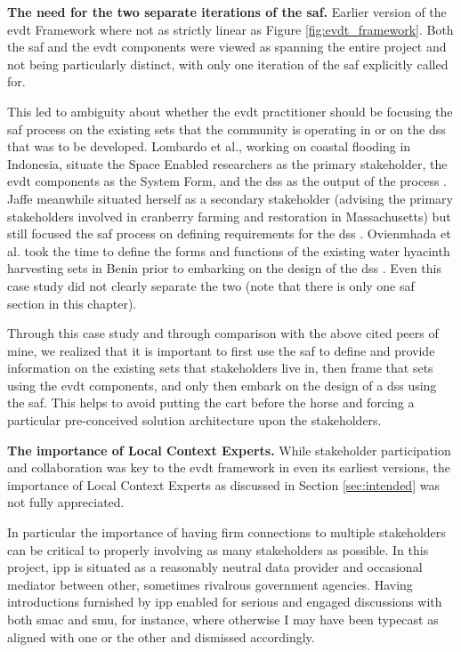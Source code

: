 \textbf{The need for the two separate iterations of the \ac{saf}.} Earlier version of the \ac{evdt} Framework where not as strictly linear as Figure \ref{fig:evdt_framework}. Both the \ac{saf} and the \ac{evdt} components were viewed as spanning the entire project and not being particularly distinct, with only one iteration of the \ac{saf} explicitly called for. 

This led to ambiguity about whether the \ac{evdt} practitioner should be focusing the \ac{saf} process on the existing {sets} that the community is operating in or on the \ac{dss} that was to be developed. Lombardo et al., working on coastal flooding in Indonesia, situate the Space Enabled researchers as the primary stakeholder, the \ac{evdt} components as the System Form, and the \ac{dss} as the output of the process \cite{lombardoEnvironmentVulnerabilityDecisionTechnologyFrameworkDecision2022}.   Jaffe meanwhile situated herself as a secondary stakeholder (advising the primary stakeholders involved in cranberry farming and restoration in Massachusetts) but still focused the \ac{saf} process on defining requirements for the \ac{dss} \cite{jaffeEnvironmentalEconomicSystems2022}. Ovienmhada et al. took the time to define the forms and functions of the existing water hyacinth harvesting \ac{sets} in Benin prior to embarking on the design of the \ac{dss} \cite{ovienmhadaInclusiveDesignEarth2021}. Even this case study did not clearly separate the two (note that there is only one \ac{saf} section in this chapter). 

Through this case study and through comparison with the above cited peers of mine, we realized that it is important to first use the \ac{saf} to define and provide information on the existing \ac{sets} that stakeholders live in, then frame that \ac{sets} using the \ac{evdt} components, and only then embark on the design of a \ac{dss} using the \ac{saf}. This helps to avoid putting the cart before the horse and forcing a particular pre-conceived solution architecture upon the stakeholders. 

\textbf{The importance of Local Context Experts.} While stakeholder participation and collaboration was key to the \ac{evdt} framework in even its earliest versions, the importance of Local Context Experts as discussed in Section \ref{sec:intended} was not fully appreciated. 

In particular the importance of having firm connections to multiple stakeholders can be critical to properly involving as many stakeholders as possible. In this project, \ac{ipp} is situated as a reasonably neutral data provider and occasional mediator between other, sometimes rivalrous government agencies. Having introductions furnished by \ac{ipp} enabled for serious and engaged discussions with both \ac{smac} and \ac{smu}, for instance, where otherwise I may have been typecast as aligned with one or the other and dismissed accordingly.  

